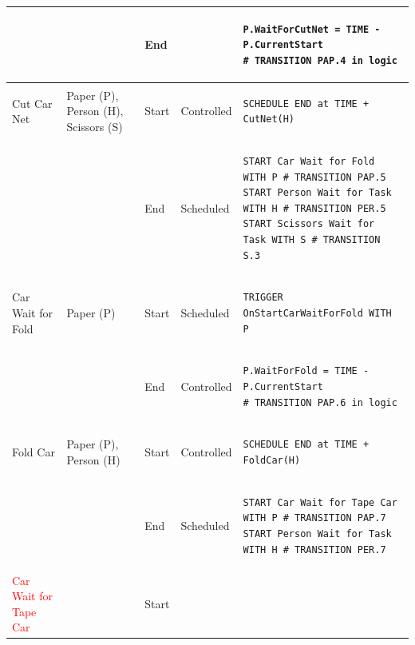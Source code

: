 \documentclass[
  10pt,
  a4paperpaper,
  DIV=11,
  numbers=noendperiod,
  oneside]{scrreprt}
\begin{document}
\begin{longtable}{@{}>{\raggedright\arraybackslash}p{1.8cm}>{\raggedright\arraybackslash}p{2.1cm}>{\raggedright\arraybackslash}p{0.9cm}>{\raggedright\arraybackslash}p{2.2cm}>{\raggedright\arraybackslash}p{8.75cm}@{}}
  &                                                          & End   &  & 
\begin{lstlisting}[language=CMPseudo]
P.WaitForCutNet = TIME - P.CurrentStart
# TRANSITION PAP.4 in logic
\end{lstlisting}             \\ \midrule
  Cut Car Net               & Paper (P), Person (H), Scissors (S)     & Start & Controlled  & 
\begin{lstlisting}[language=CMPseudo]
SCHEDULE END at TIME + CutNet(H)
\end{lstlisting}             \\
  &                                                          & End   & Scheduled &
\begin{lstlisting}[language=CMPseudo]
START Car Wait for Fold WITH P # TRANSITION PAP.5
START Person Wait for Task WITH H # TRANSITION PER.5
START Scissors Wait for Task WITH S # TRANSITION S.3
\end{lstlisting}              \\ \midrule
  Car Wait for Fold         & Paper (P)                              & Start & Scheduled  & 
\begin{lstlisting}[language=CMPseudo]
TRIGGER OnStartCarWaitForFold WITH P
\end{lstlisting}             \\
  &                                                          & End   & Controlled & 
\begin{lstlisting}[language=CMPseudo]
P.WaitForFold = TIME - P.CurrentStart
# TRANSITION PAP.6 in logic
\end{lstlisting}             \\ \midrule
  Fold Car                  & Paper (P), Person (H)                  & Start & Controlled  & 
\begin{lstlisting}[language=CMPseudo]
SCHEDULE END at TIME + FoldCar(H)
\end{lstlisting}             \\
  &                                                          & End   & Scheduled & 
\begin{lstlisting}[language=CMPseudo]
START Car Wait for Tape Car WITH P # TRANSITION PAP.7
START Person Wait for Task WITH H # TRANSITION PER.7
\end{lstlisting}             \\ \midrule
  \textcolor{Red}{Car Wait for Tape Car}     &                                & Start &   & 
\begin{lstlisting}[language=CMPseudo]
 

\end{lstlisting}
\end{longtable}
\end{document}
